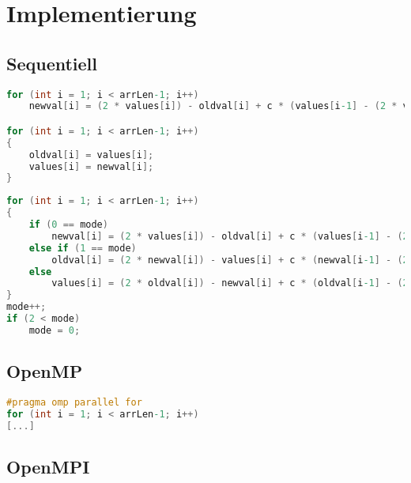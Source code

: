 
\section{Implementierung}
\subsection{Sequentiell}
\begin{lstlisting}[language=C]
for (int i = 1; i < arrLen-1; i++)
	newval[i] = (2 * values[i]) - oldval[i] + c * (values[i-1] - (2 * values[i]) + values[i+1]);

for (int i = 1; i < arrLen-1; i++) 
{
	oldval[i] = values[i];
	values[i] = newval[i];
}
\end{lstlisting}

\begin{lstlisting}[language=C]
for (int i = 1; i < arrLen-1; i++)
{
	if (0 == mode)
		newval[i] = (2 * values[i]) - oldval[i] + c * (values[i-1] - (2 * values[i]) + values[i+1]);
	else if (1 == mode)
		oldval[i] = (2 * newval[i]) - values[i] + c * (newval[i-1] - (2 * newval[i]) + newval[i+1]);
	else
		values[i] = (2 * oldval[i]) - newval[i] + c * (oldval[i-1] - (2 * oldval[i]) + oldval[i+1]);
}
mode++;
if (2 < mode)
	mode = 0;
\end{lstlisting}

\subsection{OpenMP}
\begin{lstlisting}[language=C]
#pragma omp parallel for
for (int i = 1; i < arrLen-1; i++)
[...]

\end{lstlisting}


\subsection{OpenMPI}

